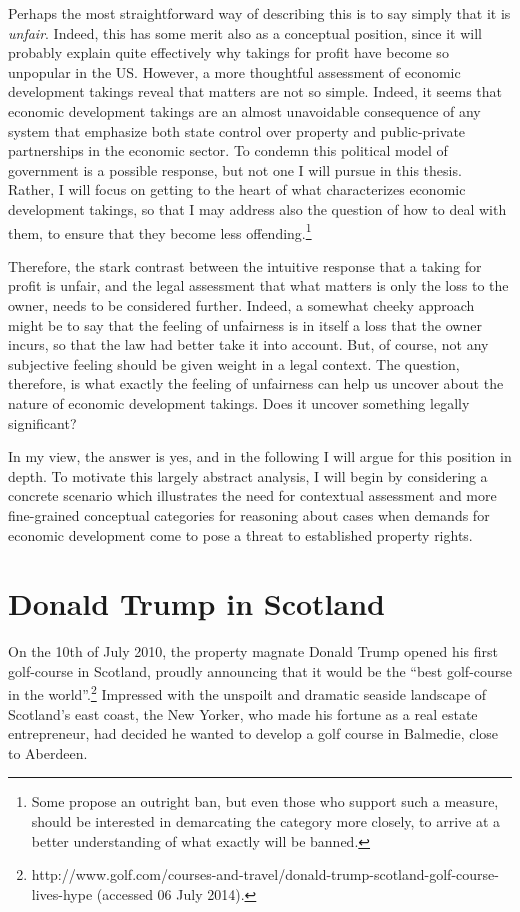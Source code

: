 Perhaps the most straightforward way of describing this is to say simply that it is {\it unfair}. Indeed, this has some merit also as a conceptual position, since it will probably explain quite effectively why takings for profit have become so unpopular in the US. However, a more thoughtful assessment of economic development takings reveal that matters are not so simple. Indeed, it seems that economic development takings are an almost unavoidable consequence of any system that emphasize both state control over property and public-private partnerships in the economic sector. To condemn this political model of government is a possible response, but not one I will pursue in this thesis. Rather, I will focus on getting to the heart of what characterizes economic development takings, so that I may address also the question of how to deal with them, to ensure that they become less offending.\footnote{Some propose an outright ban, but even those who support such a measure, should be interested in demarcating the category more closely, to arrive at a better understanding of what exactly will be banned.}

Therefore, the stark contrast between the intuitive response that a taking for profit is unfair, and the legal assessment that what matters is only the loss to the owner, needs to be considered further. Indeed, a somewhat cheeky approach might be to say that the feeling of unfairness is in itself a loss that the owner incurs, so that the law had better take it into account. But, of course, not any subjective feeling should be given weight in a legal context. The question, therefore, is what exactly the feeling of unfairness can help us uncover about the nature of economic development takings. Does it uncover something legally significant?

In my view, the answer is yes, and in the following I will argue for this position in depth. To motivate this largely abstract analysis, I will begin by considering a concrete scenario which illustrates the need for contextual assessment and more fine-grained conceptual categories for reasoning about cases when demands for economic development come to pose a threat to established property rights.

\section{Donald Trump in Scotland}

On the 10th of July 2010, the property magnate Donald Trump opened his first golf-course in Scotland, proudly announcing that it would be the ``best golf-course in the world''.\footnote{http://www.golf.com/courses-and-travel/donald-trump-scotland-golf-course-lives-hype (accessed 06 July 2014).} Impressed with the unspoilt and dramatic seaside landscape of Scotland's east coast, the New Yorker, who made his fortune as a real estate entrepreneur, had decided he wanted to develop a golf course in Balmedie, close to Aberdeen.


